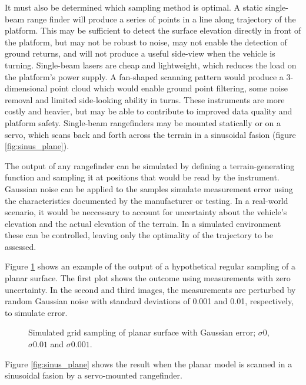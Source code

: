 \documentclass[10pt,a4paper]{report}
\begin{document}
It must also be determined which sampling method is optimal. A static single-beam range finder will produce a series of points in a line along trajectory of the platform. This may be sufficient to detect the surface elevation directly in front of the platform, but may not be robust to noise, may not enable the detection of ground returns, and will not produce a useful side-view when the vehicle is turning. Single-beam lasers are cheap and lightweight, which reduces the load on the platform's power supply. A fan-shaped scanning pattern would produce a 3-dimensional point cloud which would enable ground point filtering, some noise removal and limited side-looking ability in turns. These instruments are more costly and heavier, but may be able to contribute to improved data quality and platform safety. Single-beam rangefinders may be mounted statically or on a servo, which scans back and forth across the terrain in a sinusoidal fasion (figure \ref{fig:sinus_plane}).

The output of any rangefinder can be simulated by defining a terrain-generating function and sampling it at positions that would be read by the instrument. Gaussian noise can be applied to the samples simulate measurement error using the characteristics documented by the manufacturer or testing. In a real-world scenario, it would be neccessary to account for uncertainty about the vehicle's elevation and the actual elevation of the terrain. In a simulated environment these can be controlled, leaving only the optimality of the trajectory to be assessed.

Figure \ref{fig:point_plane} shows an example of the output of a hypothetical regular sampling of a planar surface. The first plot shows the outcome using measurements with zero uncertainty. In the second and third images, the measurements are perturbed by random Gaussian noise with standard deviations of 0.001 and 0.01, respectively, to simulate error.

\begin{figure}
\centering
\def\svgscale{0.25}

\def\svgscale{0.25}

\def\svgscale{0.25}

\caption{Simulated grid sampling of planar surface with Gaussian error; $\sigma 0$, $\sigma 0.01$ and $\sigma 0.001$.}
\label{fig:point_plane}
\end{figure}


Figure \ref{fig:sinus_plane} shows the result when the planar model is scanned in a sinusoidal fasion by a servo-mounted rangefinder.
\end{document}
